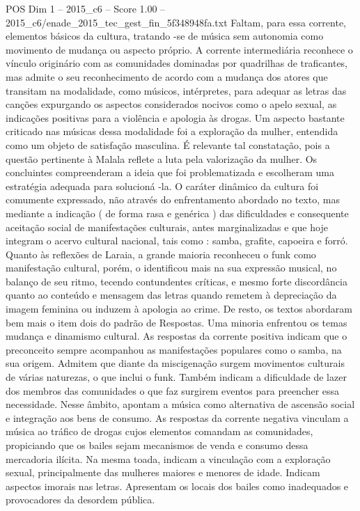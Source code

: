 \begin{textsample}{POS Dim 1 – 2015\_c6 – Score 1.00 – 2015\_c6/enade\_2015\_tec\_gest\_fin\_5f348948fa.txt}
Faltam, para essa corrente, elementos básicos da cultura, tratando -se de música sem autonomia como movimento de mudança ou aspecto próprio.
A corrente intermediária reconhece o vínculo originário com as comunidades dominadas por quadrilhas de traficantes, mas admite o seu reconhecimento de acordo com a mudança dos atores que transitam na modalidade, como músicos, intérpretes, para adequar as letras das canções expurgando os aspectos considerados nocivos como o apelo sexual, as indicações positivas para a violência e apologia às drogas.
Um aspecto bastante criticado nas músicas dessa modalidade foi a exploração da mulher, entendida como um objeto de satisfação masculina.
É relevante tal constatação, pois a questão pertinente à Malala reflete a luta pela valorização da mulher.
Os concluintes compreenderam a ideia que foi problematizada e escolheram uma estratégia adequada para solucioná -la.
O caráter dinâmico da cultura foi comumente expressado, não através do enfrentamento abordado no texto, mas mediante a indicação ( de forma rasa e genérica ) das dificuldades e consequente aceitação social de manifestações culturais, antes marginalizadas e que hoje integram o acervo cultural nacional, tais como : samba, grafite, capoeira e forró.
Quanto às reflexões de Laraia, a grande maioria reconheceu o funk como manifestação cultural, porém, o identificou mais na sua expressão musical, no balanço de seu ritmo, tecendo contundentes críticas, e mesmo forte discordância quanto ao conteúdo e mensagem das letras quando remetem à depreciação da imagem feminina ou induzem à apologia ao crime.
De resto, os textos abordaram bem mais o item dois do padrão de Respostas.
Uma minoria enfrentou os temas mudança e dinamismo cultural.
As respostas da corrente positiva indicam que o preconceito sempre acompanhou as manifestações populares como o samba, na sua origem.
Admitem que diante da miscigenação surgem movimentos culturais de várias naturezas, o que inclui o funk.
Também indicam a dificuldade de lazer dos membros das comunidades o que faz surgirem eventos para preencher essa necessidade.
Nesse âmbito, apontam a música como alternativa de ascensão social e integração aos bens de consumo.
As respostas da corrente negativa vinculam a música ao tráfico de drogas cujos elementos comandam as comunidades, propiciando que os bailes sejam mecanismos de venda e consumo dessa mercadoria ilícita.
Na mesma toada, indicam a vinculação com a exploração sexual, principalmente das mulheres maiores e menores de idade.
Indicam aspectos imorais nas letras.
Apresentam os locais dos bailes como inadequados e provocadores da desordem pública.

\end{textsample}
